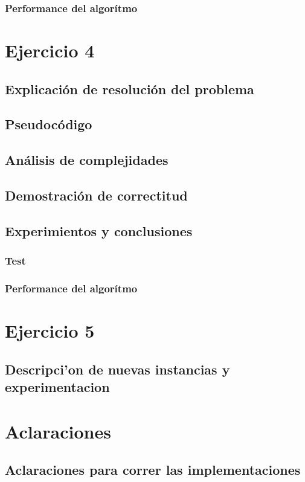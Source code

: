 \documentclass[12pt, a4paper]{article}
\begin{document}
\subsubsection[2.5]{Performance del algorítmo}
%

\newpage
\section{Ejercicio 4} 
\subsection{Explicaci\'on de resoluci\'on del problema}

\subsection{Pseudoc\'odigo}

\subsection{An\'alisis de complejidades}

\subsection{Demostraci\'on de correctitud}
%

\subsection{Experimientos y conclusiones}
\subsubsection[2.5]{Test}
%
\subsubsection[2.5]{Performance del algorítmo}
%

\newpage
\section{Ejercicio 5} 
\subsection{Descripci'on de nuevas instancias y experimentacion}



\newpage
\section{Aclaraciones} 
\subsection{Aclaraciones para correr las implementaciones}

\end{document}
